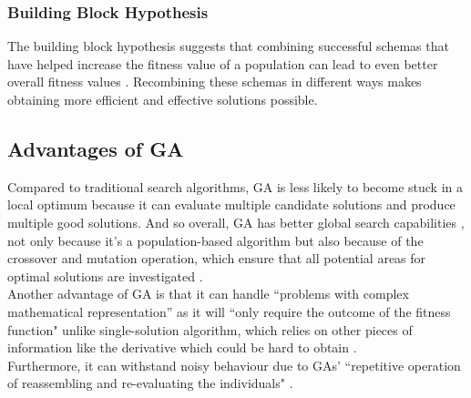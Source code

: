 \documentclass[12pt]{report}
\begin{document}
\subsubsection*{Building Block Hypothesis}
The building block hypothesis suggests that combining successful schemas that have helped increase the fitness value of a population can lead to even better overall fitness values \cite{beasley1993overview}. Recombining these schemas in different ways makes obtaining more efficient and effective solutions possible.



\subsection{Advantages of GA}
Compared to traditional search algorithms, GA is less likely to become stuck in a local optimum because it can evaluate multiple candidate solutions and produce multiple good solutions. And so overall, GA has better global search capabilities \cite{source1}, not only because it's a population-based algorithm but also because of the crossover and mutation operation, which ensure that all potential areas for optimal solutions are investigated \cite{source4}.\\ \newline
\noindent
Another advantage of GA is that it can handle “problems with complex mathematical representation” \cite{source4} as it will “only require the outcome of the fitness function" \cite{source4} unlike single-solution algorithm, which relies on other pieces of information like the derivative which could be hard to obtain \cite{source4}.\\ \newline
\noindent
Furthermore, it can withstand noisy behaviour due to GAs' “repetitive operation of reassembling and re-evaluating the individuals" \cite{source4}.
\end{document}
